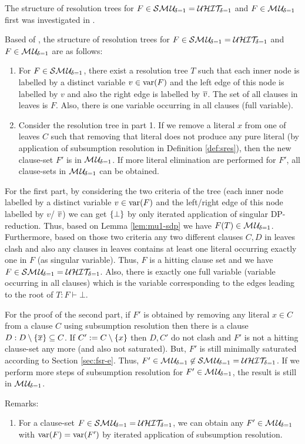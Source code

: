 \documentclass{article}
\begin{document}
The structure of resolution trees for $F \in \mathcal{S}\mathcal{M\hspace{0.8pt}U}_{\!\delta=1}=\mathcal{U}\mathcal{HIT}_{\!\!\delta=1} $ and  $F \in \mathcal{M\hspace{0.8pt}U}_{\!\delta=1}$ first was investigated in \cite{KullmannZhao2016UHitSAT}. 
\begin{lem}\label{lem:mu1-build}
Based of \cite{KullmannZhao2016UHitSAT}, the structure of resolution trees  for $F \in \mathcal{S}\mathcal{M\hspace{0.8pt}U}_{\!\delta=1}=\mathcal{U}\mathcal{HIT}_{\!\!\delta=1} $ and  $F \in \mathcal{M\hspace{0.8pt}U}_{\!\delta=1}$ are as follows:
  \begin{enumerate}
  \item For $F \in \mathcal{S}\mathcal{M\hspace{0.8pt}U}_{\!\delta=1}$, there exist a resolution tree $T$ such that each inner node is labelled by a distinct variable $v \in \operatorname{var}(F)$ and the left edge of this node is labelled by $v$ and also the right edge is labelled by $\overline v$. The set of all clauses in leaves is $F$. Also, there is one variable occurring in all clauses (full variable). 
  \item Consider the resolution tree in part 1. If we remove a literal $x$ from one of leaves $C$ such that removing that literal does not produce any pure literal (by application of subsumption resolution in Definition \ref{def:sres}), then the new clause-set $F'$ is in $ \mathcal{M\hspace{0.8pt}U}_{\!\delta=1}$. If more literal elimination are performed for $F'$, all clause-sets in $ \mathcal{M\hspace{0.8pt}U}_{\!\delta=1}$ can be obtained.
  \end{enumerate}
\end{lem}
\begin{prf}
For the first part, by considering the two criteria of the tree (each inner node labelled by a distinct variable $v \in \operatorname{var}(F)$ and the left/right edge of this node labelled by $v$/ $\overline v$) we can get $\{ \bot \}$ by only iterated application of singular DP-reduction. Thus, based on Lemma \ref{lem:mu1-sdp} we have $F(T) \in  \mathcal{M\hspace{0.8pt}U}_{\!\delta=1}$. Furthermore, based on those two criteria any two different clauses $C,D$ in leaves clash and also any clauses in leaves contains at least one literal occurring exactly one in $F$ (as singular variable). Thus, $F$ is a hitting clause set and we have $F \in \mathcal{S}\mathcal{M\hspace{0.8pt}U}_{\!\delta=1}=\mathcal{U}\mathcal{HIT}_{\!\!\delta=1} $. Also, there is exactly one full variable (variable occurring in all clauses) which is the variable corresponding to the edges leading to the root of $T:F \vdash \bot$.
 
For the proof of the second part, if $F'$ is obtained by removing any literal $x \in C$ from a clause $C$ using subsumption resolution then there is a clause $D:D \setminus \{ \overline x \} \subseteq C$. If $C':=C \setminus \{ x \}$ then $D,C'$ do not clash and $F'$ is not a hitting clause-set any more (and also not saturated). But, $F'$ is still minimally saturated according to Section \ref{sec:fsr-e}. Thus, $F'\in  \mathcal{M\hspace{0.8pt}U}_{\!\delta=1} \not \in \mathcal{S}\mathcal{M\hspace{0.8pt}U}_{\!\delta=1}=\mathcal{U}\mathcal{HIT}_{\!\!\delta=1}$. If we perform more steps of subsumption resolution for $F'\in  \mathcal{M\hspace{0.8pt}U}_{\!\delta=1}$, the result is still in $ \mathcal{M\hspace{0.8pt}U}_{\!\delta=1}$. 
\end{prf}
Remarks:
  \begin{enumerate}
  \item For a clause-set $F \in \mathcal{S}\mathcal{M\hspace{0.8pt}U}_{\!\delta=1}=\mathcal{U}\mathcal{HIT}_{\!\!\delta=1} $, we can obtain any $F' \in  \mathcal{M\hspace{0.8pt}U}_{\!\delta=1}$ with $\operatorname{var}(F)=\operatorname{var}(F')$ by iterated application of subsumption resolution.
  \end{enumerate}
\end{document}
